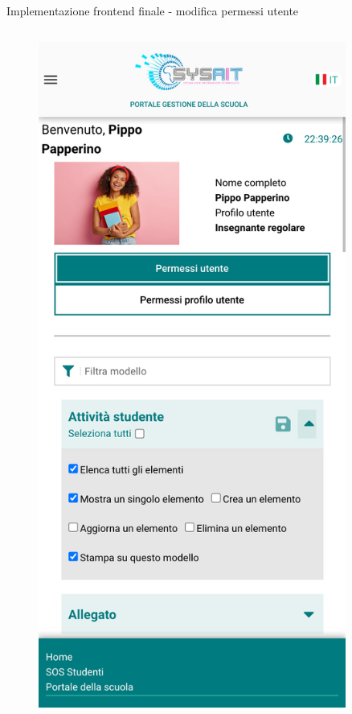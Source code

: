 \documentclass[aspectratio=169]{beamer}
\begin{document}
\begin{frame}[fragile]{Implementazione frontend finale - modifica permessi utente}
\begin{columns}[T]
\begin{column}{0.2\textwidth}
\begin{figure}
				\includegraphics[width=0.9\textwidth]{../images/permission-management-mobile.png}
			\end{figure}
		\end{column}
	\end{columns}
\end{frame}
\end{document}
